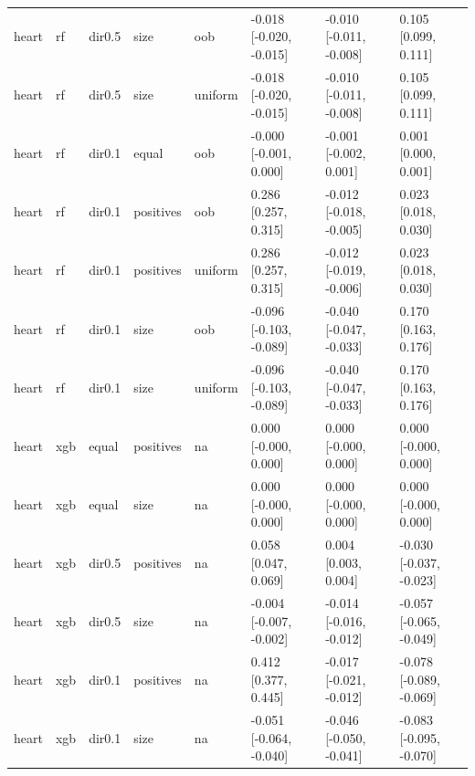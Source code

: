 \begin{tabular}{llllllll}
heart & rf & dir0.5 & size & oob & -0.018 [-0.020, -0.015] & -0.010 [-0.011, -0.008] & 0.105 [0.099, 0.111] \\
heart & rf & dir0.5 & size & uniform & -0.018 [-0.020, -0.015] & -0.010 [-0.011, -0.008] & 0.105 [0.099, 0.111] \\
heart & rf & dir0.1 & equal & oob & -0.000 [-0.001, 0.000] & -0.001 [-0.002, 0.001] & 0.001 [0.000, 0.001] \\
heart & rf & dir0.1 & positives & oob & 0.286 [0.257, 0.315] & -0.012 [-0.018, -0.005] & 0.023 [0.018, 0.030] \\
heart & rf & dir0.1 & positives & uniform & 0.286 [0.257, 0.315] & -0.012 [-0.019, -0.006] & 0.023 [0.018, 0.030] \\
heart & rf & dir0.1 & size & oob & -0.096 [-0.103, -0.089] & -0.040 [-0.047, -0.033] & 0.170 [0.163, 0.176] \\
heart & rf & dir0.1 & size & uniform & -0.096 [-0.103, -0.089] & -0.040 [-0.047, -0.033] & 0.170 [0.163, 0.176] \\
heart & xgb & equal & positives & na & 0.000 [-0.000, 0.000] & 0.000 [-0.000, 0.000] & 0.000 [-0.000, 0.000] \\
heart & xgb & equal & size & na & 0.000 [-0.000, 0.000] & 0.000 [-0.000, 0.000] & 0.000 [-0.000, 0.000] \\
heart & xgb & dir0.5 & positives & na & 0.058 [0.047, 0.069] & 0.004 [0.003, 0.004] & -0.030 [-0.037, -0.023] \\
heart & xgb & dir0.5 & size & na & -0.004 [-0.007, -0.002] & -0.014 [-0.016, -0.012] & -0.057 [-0.065, -0.049] \\
heart & xgb & dir0.1 & positives & na & 0.412 [0.377, 0.445] & -0.017 [-0.021, -0.012] & -0.078 [-0.089, -0.069] \\
heart & xgb & dir0.1 & size & na & -0.051 [-0.064, -0.040] & -0.046 [-0.050, -0.041] & -0.083 [-0.095, -0.070] \\
\bottomrule
\end{tabular}
